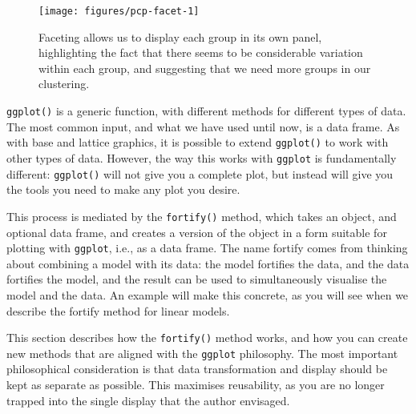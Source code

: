 \begin{Shaded}
\begin{Highlighting}[]
\StringTok{ }\NormalTok{(}  \NormalTok{/}\NormalTok{) +}
\StringTok{  }\NormalTok{(~}\StringTok{ }
\end{Highlighting}
\end{Shaded}

\begin{figure}
\texttt{[image: figures/pcp-facet-1]} \caption{Faceting allows us to display each group in its own panel, highlighting the fact that there seems to be considerable variation within each group, and suggesting that we need more groups in our clustering.\label{fig:pcp-facet}}
\end{figure}


\texttt{ggplot()} is a generic function, with different methods for
different types of data. The most common input, and what we have used
until now, is a data frame. As with base and lattice graphics, it is
possible to extend \texttt{ggplot()} to work with other types of data.
However, the way this works with \texttt{ggplot} is fundamentally
different: \texttt{ggplot()} will not give you a complete plot, but
instead will give you the tools you need to make any plot you desire.

This process is mediated by the \texttt{fortify()} method, which takes
an object, and optional data frame, and creates a version of the object
in a form suitable for plotting with \texttt{ggplot}, i.e., as a data
frame. The name fortify comes from thinking about combining a model with
its data: the model fortifies the data, and the data fortifies the
model, and the result can be used to simultaneously visualise the model
and the data. An example will make this concrete, as you will see when
we describe the fortify method for linear models. 

This section describes how the \texttt{fortify()} method works, and how
you can create new methods that are aligned with the \texttt{ggplot}
philosophy. The most important philosophical consideration is that data
transformation and display should be kept as separate as possible. This
maximises reusability, as you are no longer trapped into the single
display that the author envisaged.

